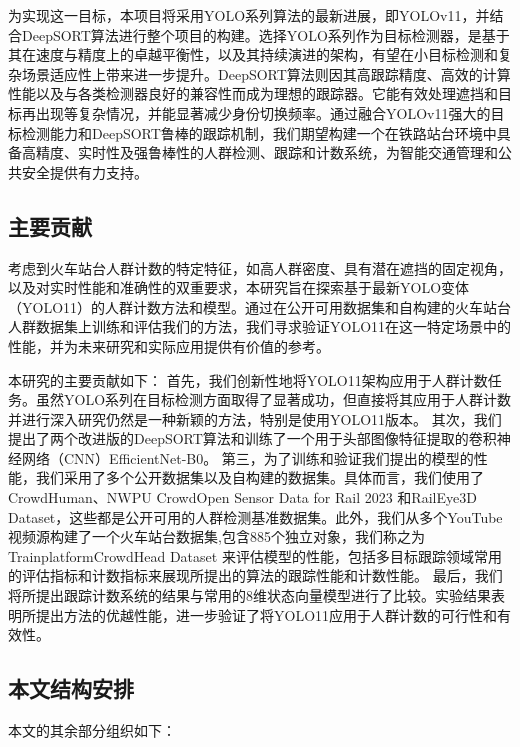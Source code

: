 为实现这一目标，本项目将采用YOLO系列算法的最新进展，即YOLOv11，并结合DeepSORT算法进行整个项目的构建。选择YOLO系列作为目标检测器，是基于其在速度与精度上的卓越平衡性\cite{141}，以及其持续演进的架构，有望在小目标检测和复杂场景适应性上带来进一步提升。DeepSORT算法则因其高跟踪精度、高效的计算性能以及与各类检测器良好的兼容性而成为理想的跟踪器。它能有效处理遮挡和目标再出现等复杂情况，并能显著减少身份切换频率。通过融合YOLOv11强大的目标检测能力和DeepSORT鲁棒的跟踪机制，我们期望构建一个在铁路站台环境中具备高精度、实时性及强鲁棒性的人群检测、跟踪和计数系统，为智能交通管理和公共安全提供有力支持。

\subsection{主要贡献}
考虑到火车站台人群计数的特定特征，如高人群密度、具有潜在遮挡的固定视角，以及对实时性能和准确性的双重要求，本研究旨在探索基于最新YOLO变体（YOLO11）的人群计数方法和模型。通过在公开可用数据集和自构建的火车站台人群数据集上训练和评估我们的方法，我们寻求验证YOLO11在这一特定场景中的性能，并为未来研究和实际应用提供有价值的参考。

本研究的主要贡献如下：
首先，我们创新性地将YOLO11架构应用于人群计数任务。虽然YOLO系列在目标检测方面取得了显著成功，但直接将其应用于人群计数并进行深入研究仍然是一种新颖的方法，特别是使用YOLO11版本。
其次，我们提出了两个改进版的DeepSORT算法和训练了一个用于头部图像特征提取的卷积神经网络（CNN）EfficientNet-B0。
第三，为了训练和验证我们提出的模型的性能，我们采用了多个公开数据集以及自构建的数据集。具体而言，我们使用了CrowdHuman\cite{shao2018crowdhuman}、NWPU Crowd\cite{nwpcrowd}Open Sensor Data for Rail 2023 \cite{OpenSensorDataforRail2023}和RailEye3D Dataset\cite{RailEye3D_Dataset}，这些都是公开可用的人群检测基准数据集。此外，我们从多个YouTube视频源构建了一个火车站台数据集,包含885个独立对象，我们称之为 TrainplatformCrowdHead Dataset 来评估模型的性能，包括多目标跟踪领域常用的评估指标和计数指标来展现所提出的算法的跟踪性能和计数性能。
最后，我们将所提出跟踪计数系统的结果与常用的8维状态向量模型进行了比较。实验结果表明所提出方法的优越性能，进一步验证了将YOLO11应用于人群计数的可行性和有效性。

\subsection{本文结构安排}

本文的其余部分组织如下：

